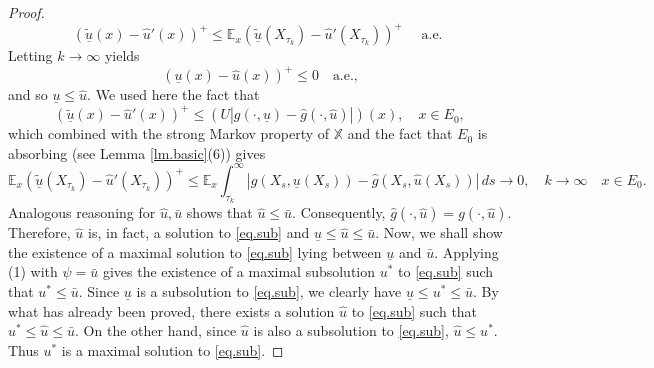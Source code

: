 \documentclass[11pt,a4paper,reqno]{amsart}
\theoremstyle{definition}
\numberwithin{equation}{section}
\begin{document}
\begin{proof}
$$
(\underline{\tilde u}(x)-\hat{u}'(x))^{+} \leq 
\mathbb{E}_x\left(\underline{\tilde u}\left(X_{\tau_k}\right)-\hat{u}'\left(X_{\tau_k}\right)\right)^{+} 
\quad \text { a.e. }
$$
Letting $k \rightarrow \infty$  yields
$$
(\underline{u}(x)-\hat{u}(x))^{+} \leq 0\quad\text{a.e.,}
$$
and so $\underline{u} \leq \hat{u} $. We used here the fact that 
\[
(\underline{\tilde u}(x)-\hat{u}'(x))^{+} \le (U|g(\cdot,\underline u)-\hat g(\cdot,\hat u)|)(x),\quad x\in E_0,
\]
which combined with the strong Markov property of $\mathbb X$
 and the fact that $E_0$ is absorbing (see Lemma \ref{lm.basic}(6)) gives 
\[
\mathbb{E}_x\left(\underline{\tilde u}\left(X_{\tau_k}\right)-\hat{u}'\left(X_{\tau_k}\right)\right)^{+} 
\le \mathbb E_x\int_{\tau_k}^\infty|g(X_s,\underline u(X_s))-\hat g(X_s,\hat u(X_s))|\,ds\to 0,\quad k\to \infty \quad x\in E_0.
\]
Analogous reasoning for $\hat{u}, \bar{u}$ shows that $\hat{u} \leq \bar{u}$.
 Consequently, $\hat{g}(\cdot, \hat{u})=g(\cdot, \hat{u})$. 
 Therefore, $\hat{u}$ is, in fact, a solution to \eqref{eq.sub} and $\underline{u} \leq \hat{u} \leq \bar{u}$.
 Now, we shall show the existence of a maximal solution to \eqref{eq.sub} lying between $\underline{u}$ and  $\bar{u}$. 
 Applying (1) with $\psi=\bar{u}$ gives the existence of a maximal subsolution $u^*$ to \eqref{eq.sub}
 such that $u^* \leq \bar{u}$. Since $\underline u$ is a subsolution to
 \eqref{eq.sub}, we clearly have $\underline{u} \leq u^* \leq \bar{u}$.  By what has already been  proved, 
 there exists a solution $\hat{u}$ to \eqref{eq.sub} such that $u^* \leq \hat{u} \leq \bar{u}$.
 On the other hand, since $\hat{u}$ is also  a subsolution to \eqref{eq.sub}, $\hat{u} \leq u^*$.
Thus $u^*$ is a maximal solution to \eqref{eq.sub}.
\end{proof}
\end{document}
